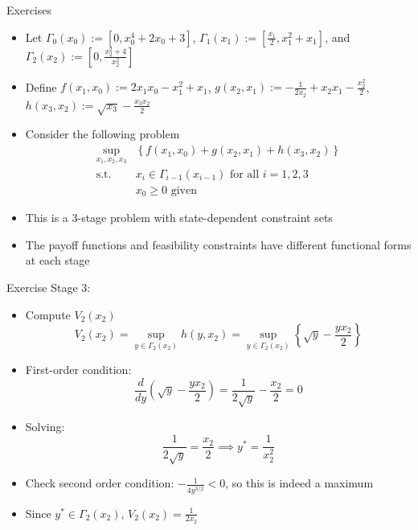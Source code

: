 \documentclass[9pt,aspectratio=169]{beamer}
\begin{document}
\begin{frame}{Exercises}
    \begin{itemize}
        \item Let $\Gamma_0(x_0) := [0, x_0^4 + 2x_0 + 3]$, $\Gamma_1(x_1) :=
        \left[\frac{x_1}{2}, x_1^2 + x_1\right]$, and $\Gamma_2(x_2) :=
        \left[0, \frac{x_2^2 + 4}{x_2^2}\right]$
        \item Define $f(x_1, x_0) := 2x_1x_0 - x_1^2 + x_1$, $g(x_2, x_1) :=
        -\frac{1}{2x_2} + x_2x_1 - \frac{x_2^2}{2}$, $h(x_3, x_2) :=
        \sqrt{x_3} - \frac{x_3x_2}{2}$
        \item Consider the following problem
        \begin{align*}
            \sup_{x_1,x_2,x_3} &\left\{f(x_1, x_0) + g(x_2, x_1) + h(x_3, x_2)
            \right\}\\
            \text{s.t. } &x_i \in \Gamma_{i-1}(x_{i-1}) \text{ for all } i =
            1, 2, 3\\
            & x_0 \geq 0 \text{ given}
        \end{align*}
        \item This is a 3-stage problem with state-dependent constraint sets
        \item The payoff functions and feasibility constraints have different
        functional forms at each stage
    \end{itemize}
\end{frame}

\begin{frame}{Exercise}
    Stage 3:
    \begin{itemize}
        \item Compute $V_2(x_2)$
        \[
            V_2(x_2) = \sup_{y \in \Gamma_2(x_2)} h(y, x_2) = \sup_{y \in
              \Gamma_2(x_2)} \left\{\sqrt{y} - \frac{yx_2}{2}\right\}
        \]
        \item First-order condition:
        \[
            \frac{d}{d y}\left(\sqrt{y} - \frac{yx_2}{2}\right)
            = \frac{1}{2\sqrt{y}} - \frac{x_2}{2} = 0
        \]
        \item Solving:
        \[
            \frac{1}{2\sqrt{y}} = \frac{x_2}{2} \implies y^* = \frac{1}{x_2^2}
        \]
        \item Check second order condition: $-\frac{1}{4y^{3/2}} < 0$, so
        this is indeed a maximum
        \item Since $y^* \in \Gamma_2(x_2)$, $V_2(x_2) = {\frac{1}{2x_2}}$
    \end{itemize}
\end{frame}
\end{document}
